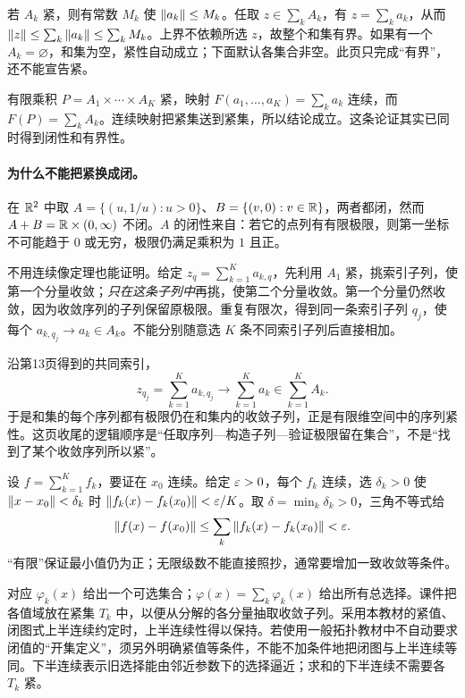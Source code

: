若 $A_k$ 紧，则有常数 $M_k$ 使 $\left\lVert a_k\right\rVert\le M_k$。任取 $z\in\sum_k A_k$，有 $z=\sum_k a_k$，从而 $\left\lVert z\right\rVert\le\sum_k\left\lVert a_k\right\rVert\le\sum_k M_k$。上界不依赖所选 $z$，故整个和集有界。如果有一个 $A_k=\varnothing$，和集为空，紧性自动成立；下面默认各集合非空。此页只完成“有界”，还不能宣告紧。

有限乘积 $P=A_1\times\cdots\times A_K$ 紧，映射 $F(a_1,\ldots,a_K)=\sum_k a_k$ 连续，而 $F(P)=\sum_k A_k$。连续映射把紧集送到紧集，所以结论成立。这条论证其实已同时得到闭性和有界性。
\paragraph{为什么不能把紧换成闭。} 在 $\mathbb{R}^2$ 中取 $A=\{(u,1/u):u>0\}$、$B=\{(v,0):v\in\mathbb{R}\}$，两者都闭，然而 $A+B=\mathbb{R}\times(0,\infty)$ 不闭。$A$ 的闭性来自：若它的点列有有限极限，则第一坐标不可能趋于 $0$ 或无穷，极限仍满足乘积为 $1$ 且正。

不用连续像定理也能证明。给定 $z_q=\sum_{k=1}^K a_{k,q}$，先利用 $A_1$ 紧，挑索引子列，使第一个分量收敛；\emph{只在这条子列中}再挑，使第二个分量收敛。第一个分量仍然收敛，因为收敛序列的子列保留原极限。重复有限次，得到同一条索引子列 $q_j$，使每个 $a_{k,q_j}\to a_k\in A_k$。不能分别随意选 $K$ 条不同索引子列后直接相加。

沿第13页得到的共同索引，
\[z_{q_j}=\sum_{k=1}^K a_{k,q_j}\longrightarrow\sum_{k=1}^K a_k\in\sum_{k=1}^K A_k.\]
于是和集的每个序列都有极限仍在和集内的收敛子列，正是有限维空间中的序列紧性。这页收尾的逻辑顺序是“任取序列—构造子列—验证极限留在集合”，不是“找到了某个收敛序列所以紧”。

设 $f=\sum_{k=1}^K f_k$，要证在 $x_0$ 连续。给定 $\varepsilon>0$，每个 $f_k$ 连续，选 $\delta_k>0$ 使 $\left\lVert x-x_0\right\rVert<\delta_k$ 时 $\left\lVert f_k(x)-f_k(x_0)\right\rVert<\varepsilon/K$。取 $\delta=\min_k\delta_k>0$，三角不等式给
\[\left\lVert f(x)-f(x_0)\right\rVert\le\sum_k\left\lVert f_k(x)-f_k(x_0)\right\rVert<\varepsilon.\]
“有限”保证最小值仍为正；无限级数不能直接照抄，通常要增加一致收敛等条件。

对应 $\varphi_k(x)$ 给出一个可选集合；$\varphi(x)=\sum_k\varphi_k(x)$ 给出所有总选择。课件把各值域放在紧集 $T_k$ 中，以便从分解的各分量抽取收敛子列。采用本教材的紧值、闭图式上半连续约定时，上半连续性得以保持。若使用一般拓扑教材中不自动要求闭值的“开集定义”，须另外明确紧值等条件，不能不加条件地把闭图与上半连续等同。下半连续表示旧选择能由邻近参数下的选择逼近；求和的下半连续不需要各 $T_k$ 紧。

